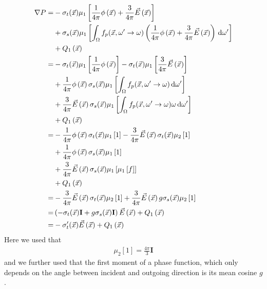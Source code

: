 \begin{align*}
\nabla P =&
-\sigma_t(\vec{x})\mu_1\left[\frac{1}{4\pi}\phi\left(\vec{x}\right) + \frac{3}{4\pi}\vec{E}\left(\vec{x}\right)\right]
\\&
+\sigma_s(\vec{x})\mu_1\left[\int_{\Omega}f_p(\vec{x}, \omega'\rightarrow\omega)\left(\frac{1}{4\pi}\phi\left(\vec{x}\right) + \frac{3}{4\pi}\vec{E}\left(\vec{x}\right)\right)\,\mathrm{d}\omega'\right]
\\&
\nonumber
+ Q_1\left(\vec{x}\right)
\\
=&
-\sigma_t(\vec{x})\mu_1\left[\frac{1}{4\pi}\phi\left(\vec{x}\right)\right]
-\sigma_t(\vec{x})\mu_1\left[\frac{3}{4\pi}\vec{E}\left(\vec{x}\right)\right]
\\
&
+\frac{1}{4\pi}\phi\left(\vec{x}\right)\sigma_s(\vec{x})\mu_1\left[\int_{\Omega}f_p(\vec{x}, \omega'\rightarrow\omega)\,\mathrm{d}\omega'\right]
\\
&
+\frac{3}{4\pi}\vec{E}\left(\vec{x}\right)\sigma_s(\vec{x})\mu_1\left[\int_{\Omega}f_p(\vec{x}, \omega'\rightarrow\omega)\omega\,\mathrm{d}\omega'\right]
\\
&
+Q_1\left(\vec{x}\right)
\\
=&
-\frac{1}{4\pi}\phi\left(\vec{x}\right)\sigma_t(\vec{x})\mu_1\left[1\right]
-\frac{3}{4\pi}\vec{E}\left(\vec{x}\right)\sigma_t(\vec{x})\mu_2\left[1\right]
\\
&
+\frac{1}{4\pi}\phi\left(\vec{x}\right)\sigma_s(\vec{x})\mu_1\left[1\right]
\\
&
+\frac{3}{4\pi}\vec{E}\left(\vec{x}\right)\sigma_s(\vec{x})\mu_1\left[\mu_1\left[f\right]\right]
\\
&
+Q_1\left(\vec{x}\right)
\\
=&
-\frac{3}{4\pi}\vec{E}\left(\vec{x}\right)\sigma_t(\vec{x})\mu_2\left[1\right]
+\frac{3}{4\pi}\vec{E}\left(\vec{x}\right)g\sigma_s(\vec{x})\mu_2\left[1\right]
\\
=&
\left(-\sigma_t(\vec{x})\mathbf{I} + g\sigma_s(\vec{x})\mathbf{I}\right)\vec{E}\left(\vec{x}\right)
+Q_1\left(\vec{x}\right)
\\
=&
-\sigma_t'(\vec{x})\vec{E}\left(\vec{x}\right)
+Q_1\left(\vec{x}\right)
\end{align*}
Here we used that
\begin{align*}
\mu_2[1] = \frac{4\pi}{3}\mathbf{I}
\end{align*}
and we further used that the first moment of a phase function, which only depends on the angle between incident and outgoing direction is its mean cosine $g$.

